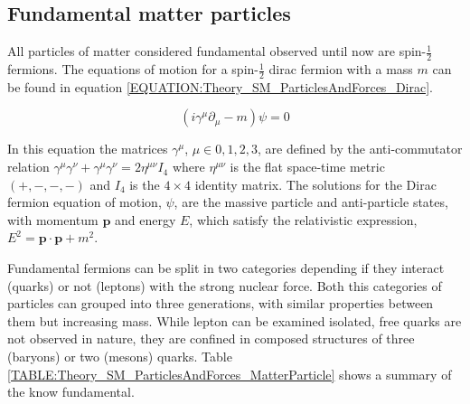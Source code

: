 \subsection{Fundamental matter particles}
\label{SUBSECTION:Theory_SM_ParticlesAndForces}


All particles of matter considered fundamental observed until now are spin-$\frac{1}{2}$ fermions. The equations of motion for a spin-$\frac{1}{2}$ dirac fermion with a mass $m$ can be found in equation \ref{EQUATION:Theory_SM_ParticlesAndForces_Dirac}.

\begin{equation}
(i\gamma^{\mu}\partial_{\mu} - m)\psi = 0
\label{EQUATION:Theory_SM_ParticlesAndForces_Dirac}
\end{equation}

In this equation the matrices $\gamma^{\mu}$, $\mu\in{0,1,2,3}$, are defined by the anti-commutator relation $\gamma^{\mu}\gamma^{\nu}+\gamma^{\mu}\gamma^{\nu} = 2\eta^{\mu\nu}I_{4}$ where $\eta^{\mu\nu}$ is the flat space-time metric $(+,-,-,-)$ and $I_{4}$ is the $4\times4$ identity matrix. The solutions for the Dirac fermion equation of motion, $\psi$, are the massive particle and anti-particle states, with momentum $\mathbf{p}$ and energy $E$, which satisfy the relativistic expression, $E^{2} = \mathbf{p}\cdot\mathbf{p} + m^{2}$.

Fundamental fermions can be split in two categories depending if they interact (quarks) or not (leptons) with the strong nuclear force. Both this categories of particles can grouped into three generations, with similar properties between them but increasing mass. While lepton can be examined isolated, free quarks are not observed in nature, they are confined in composed structures of three (baryons) or two (mesons) quarks. Table \ref {TABLE:Theory_SM_ParticlesAndForces_MatterParticle} shows a summary of the know fundamental.

